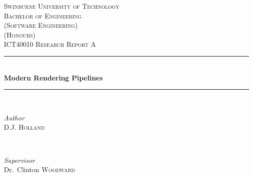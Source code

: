 \begin{titlepage} %
  \newcommand{\HRule}{\rule{\linewidth}{0.5mm}} %

  \center{} %


  \textsc{\LARGE Swinburne University of Technology}\\[1.5cm]

  \textsc{
    \Large
    Bachelor of Engineering\\
    (Software Engineering)\\
    (Honours)
  }\\[0.5cm]

  \textsc{\large ICT40010 Research Report A}\\[0.5cm]


  \HRule{}\\[0.4cm]

  {\huge\bfseries Modern Rendering Pipelines}\\[0.2cm]

  \HRule{}\\[1.5cm]


  \begin{minipage}{0.4\textwidth}
    \begin{flushleft}
      \large
      \textit{Author}\\
      D.J. \textsc{Holland} %
    \end{flushleft}
  \end{minipage}
  {~}
  \begin{minipage}{0.4\textwidth}
    \begin{flushright}
      \large
      \textit{Supervisor}\\
      Dr.\ Clinton \textsc{Woodward} %
    \end{flushright}
  \end{minipage}


\end{titlepage}

